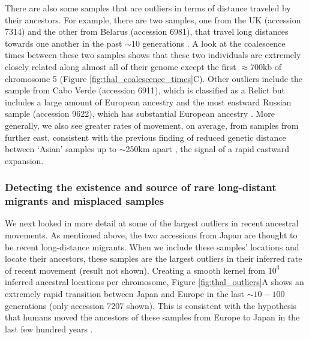 \documentclass[12pt]{article}
\begin{document}

There are also some samples that are outliers in terms of distance traveled by their ancestors.
For example, there are two samples, one from the UK (accession 7314) and the other from Belarus (accession 6981), that travel long distances towards one another in the past $\sim10$ generations \citep[see also Figure 3B in][]{alonso2016}. 
A look at the coalescence times between these two samples shows that these two individuals are extremely closely related along almost all of their genome except the first $\approx700$kb of chromosome 5 (Figure \ref{fig:thal_coalescence_times}C).
Other outliers include the sample from Cabo Verde (accession 6911), which is classified as a Relict but includes a large amount of European ancestry \citep{alonso2016} and the most eastward Russian sample (accession 9622), which has substantial European ancestry \citep{alonso2016}.
More generally, we also see greater rates of movement, on average, from samples from further east, consistent with the previous finding of reduced genetic distance between `Asian' samples up to $\sim$250km apart \citep{alonso2016}, the signal of a rapid eastward expansion. 

\subsubsection*{Detecting the existence and source of rare long-distant migrants and misplaced samples}

We next looked in more detail at some of the largest outliers in recent ancestral movements.
As mentioned above, the two accessions from Japan are thought to be recent long-distance migrants.
When we include these samples' locations and locate their ancestors, these samples are the largest outliers in their inferred rate of recent movement (result not shown).
Creating a smooth kernel from $10^3$ inferred ancestral locations per chromosome, Figure \ref{fig:thal_outliers}A shows an extremely rapid transition between Japan and Europe in the last $\sim10-100$ generations (only accession 7207 shown).
This is consistent with the hypothesis that humans moved the ancestors of these samples from Europe to Japan in the last few hundred years \citep{zou2017adaptation}. 

\end{document}
